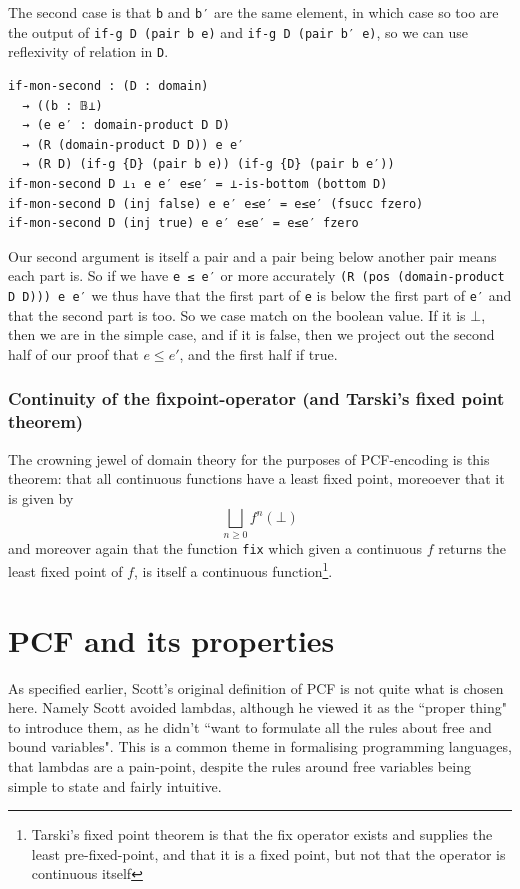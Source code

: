 \documentclass[12pt,a4paper,twoside,openright]{report}
\begin{document}
The second case is that \texttt{b} and \texttt{b′} are the same element, in which case so too are the output of \texttt{if-g {D} (pair b e)} and \texttt{if-g {D} (pair b′ e)}, so we can use reflexivity of relation in \texttt{D}. 
\begin{verbatim}
if-mon-second : (D : domain)
  → ((b : 𝔹⊥)
  → (e e′ : domain-product D D)
  → (R (domain-product D D)) e e′
  → (R D) (if-g {D} (pair b e)) (if-g {D} (pair b e′))
if-mon-second D ⊥₁ e e′ e≤e′ = ⊥-is-bottom (bottom D)
if-mon-second D (inj false) e e′ e≤e′ = e≤e′ (fsucc fzero) 
if-mon-second D (inj true) e e′ e≤e′ = e≤e′ fzero
\end{verbatim}
Our second argument is itself a pair and a pair being below another pair means each part is. So if we have \texttt{e ≤ e′} or more accurately \texttt{(R (pos (domain-product D D))) e e′} we thus have that the first part of \texttt{e} is below the first part of \texttt{e′} and that the second part is too. So we case match on the boolean value. If it is $\bot$, then we are in the simple case, and if it is false, then we project out the second half of our proof that $e \leq e′$, and the first half if true. 
\subsubsection{Continuity of the fixpoint-operator (and Tarski's fixed point theorem)}
The crowning jewel of domain theory for the purposes of PCF-encoding is this theorem: that all continuous functions have a least fixed point, moreoever that it is given by
\[
\bigsqcup_{n \geq 0} f^n(\bot)
\]
and moreover again that the function \texttt{fix} which given a continuous $f$ returns the least fixed point of $f$, is itself a continuous function\footnote{Tarski's fixed point theorem is that the fix operator exists and supplies the least pre-fixed-point, and that it is a fixed point, but not that the operator is continuous itself}.
\section{PCF and its properties}
As specified earlier, Scott's original definition of PCF is not quite what is chosen here. Namely Scott avoided lambdas, although he viewed it as the ``proper thing" to introduce them, as he didn't ``want to formulate all the rules about free and bound variables". This is a common theme in formalising programming languages, that lambdas are a pain-point, despite the rules around free variables being simple to state and fairly intuitive. 
\end{document}
